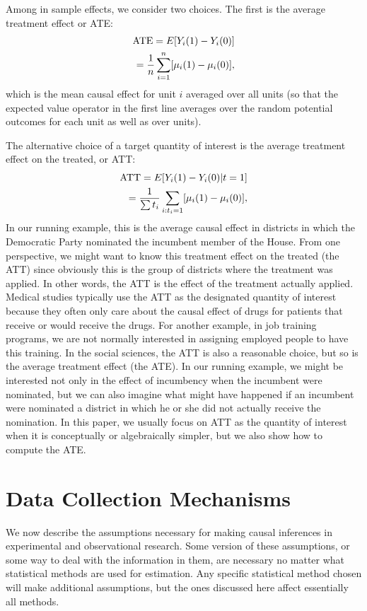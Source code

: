 \documentclass[11pt,titlepage]{article}
\begin{document}
Among in sample effects, we consider two choices.  The first is the
average treatment effect or ATE:
\begin{align}
  \label{pate}
  \text{ATE} = E[Y_i(1) - Y_i(0)] \notag\\
  = \frac{1}{n}\sum_{i=1}^n[\mu_i(1) - \mu_i(0)],
\end{align}
which is the mean causal effect for unit $i$ averaged over all units
(so that the expected value operator in the first line averages over
the random potential outcomes for each unit as well as over units).

The alternative choice of a target quantity of interest is the average
treatment effect on the treated, or ATT:
\begin{align}
  \label{att}
  \text{ATT} = E[Y_i(1) - Y_i(0)|t=1] \notag\\
  = \frac{1}{\sum t_i}\sum_{i:t_i=1}[\mu_i(1) - \mu_i(0)],
\end{align}
In our running example, this is the average causal effect in districts
in which the Democratic Party nominated the incumbent member of the
House.  From one perspective, we might want to know this treatment
effect on the treated (the ATT) since obviously this is the group of
districts where the treatment was applied.  In other words, the ATT is
the effect of the treatment actually applied.  Medical studies
typically use the ATT as the designated quantity of interest because
they often only care about the causal effect of drugs for patients
that receive or would receive the drugs.  For another example, in job
training programs, we are not normally interested in assigning
employed people to have this training.  In the social sciences, the
ATT is also a reasonable choice, but so is the average treatment
effect (the ATE).  In our running example, we might be interested not
only in the effect of incumbency when the incumbent were nominated,
but we can also imagine what might have happened if an incumbent were
nominated a district in which he or she did not actually receive the
nomination.  In this paper, we usually focus on ATT as the quantity of
interest when it is conceptually or algebraically simpler, but we also
show how to compute the ATE.

\section{Data Collection Mechanisms}

We now describe the assumptions necessary for making causal inferences
in experimental and observational research.  Some version of these
assumptions, or some way to deal with the information in them, are
necessary no matter what statistical methods are used for estimation.
Any specific statistical method chosen will make additional
assumptions, but the ones discussed here affect essentially all
methods.
\end{document}
